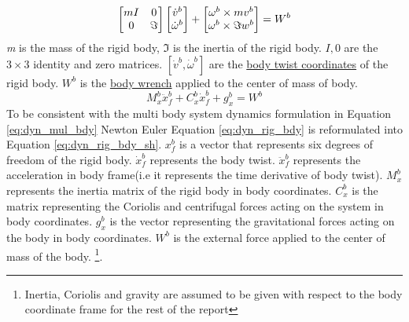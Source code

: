 \begin{equation}
\label{eq:dyn_rig_bdy}
\begin{bmatrix}
mI &0 \\ 0 &\Im
\end{bmatrix}
\begin{bmatrix}
\dot{v}^b\\ \dot{\omega}^b
\end{bmatrix}
+ \begin{bmatrix}
\omega^b \times mv^b \\ 
\omega^b \times \Im w^b
\end{bmatrix}
= W^b\\
\end{equation}
\emph{m} is the mass of the rigid body, $\Im$ is the inertia of the rigid body. $I,0$ are the $3 \times 3$ identity and zero matrices. $[\dot{v}^b,\dot{\omega}^b]$ are the \underline{body twist coordinates} of the rigid body. $W^b$ is the \underline{body wrench}  applied to the center of mass of body.
\begin{equation}
\label{eq:dyn_rig_bdy_sh}
M_x^b \ddot{x}_f^b + C_x^b\dot{x}_f^b+g_x^b = W^b
\end{equation}
To be consistent with the multi body system dynamics formulation in Equation \ref{eq:dyn_mul_bdy} Newton Euler Equation \ref{eq:dyn_rig_bdy} is reformulated into Equation \ref{eq:dyn_rig_bdy_sh}. $x_f^b$ is a vector that represents six degrees of freedom of the rigid body. $\dot{x}_f^b$ represents the body twist. $\ddot{x}_f^b$ represents the acceleration in body frame(i.e it represents the time derivative of body twist). $M_x^b$ represents the inertia matrix of the rigid body in body coordinates. $C_x^b$ is the matrix representing the Coriolis and centrifugal forces acting on the system in body coordinates. $g_x^b$ is the vector representing the gravitational forces acting on the body in body coordinates. $W^b$ is the external force applied to the center of mass of the body. \footnote[2]{Inertia, Coriolis and gravity are assumed to be given with respect to the body coordinate frame for the rest of the report}.


